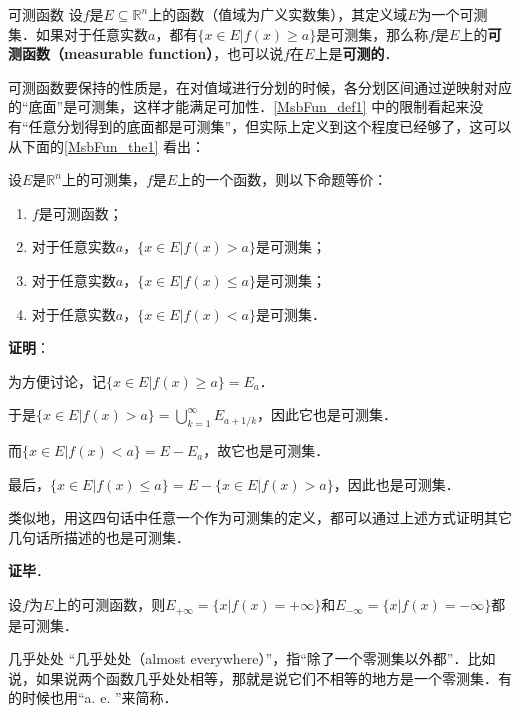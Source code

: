 \begin{definition}{可测函数}\label{MsbFun_def1}
设$f$是$E\subseteq\mathbb{R}^n$上的函数（值域为广义实数集），其定义域$E$为一个可测集．如果对于任意实数$a$，都有$\{x\in E|f(x)\geq a\}$是可测集，那么称$f$是$E$上的\textbf{可测函数（measurable function）}，也可以说$f$在$E$上是\textbf{可测的}．
\end{definition}


可测函数要保持的性质是，在对值域进行分划的时候，各分划区间通过逆映射对应的“底面”是可测集，这样才能满足可加性．\autoref{MsbFun_def1} 中的限制看起来没有“任意分划得到的底面都是可测集”，但实际上定义到这个程度已经够了，这可以从下面的\autoref{MsbFun_the1} 看出：


\begin{theorem}{}\label{MsbFun_the1}
设$E$是$\mathbb{R}^n$上的可测集，$f$是$E$上的一个函数，则以下命题等价：
\begin{enumerate}
\item $f$是可测函数；
\item 对于任意实数$a$，$\{x\in E|f(x)>a\}$是可测集；
\item 对于任意实数$a$，$\{x\in E|f(x)\leq a\}$是可测集；
\item 对于任意实数$a$，$\{x\in E|f(x)<a\}$是可测集．
\end{enumerate}
\end{theorem}

\textbf{证明}：

为方便讨论，记$\{x\in E|f(x)\geq a\}=E_a$．

于是$\{x\in E|f(x)>a\}=\bigcup_{k=1}^\infty E_{a+1/k}$，因此它也是可测集．

而$\{x\in E|f(x)<a\}=E-E_a$，故它也是可测集．

最后，$\{x\in E|f(x)\leq a\}=E-\{x\in E|f(x)>a\}$，因此也是可测集．

类似地，用这四句话中任意一个作为可测集的定义，都可以通过上述方式证明其它几句话所描述的也是可测集．

\textbf{证毕}．





\begin{corollary}{}
设$f$为$E$上的可测函数，则$E_{+\infty}=\{x|f(x)=+\infty\}$和$E_{-\infty}=\{x|f(x)=-\infty\}$都是可测集．
\end{corollary}



\begin{definition}{几乎处处}
“几乎处处（almost everywhere）”，指“除了一个零测集以外都”．比如说，如果说两个函数几乎处处相等，那就是说它们不相等的地方是一个零测集．有的时候也用“a. e. ”来简称．
\end{definition}

